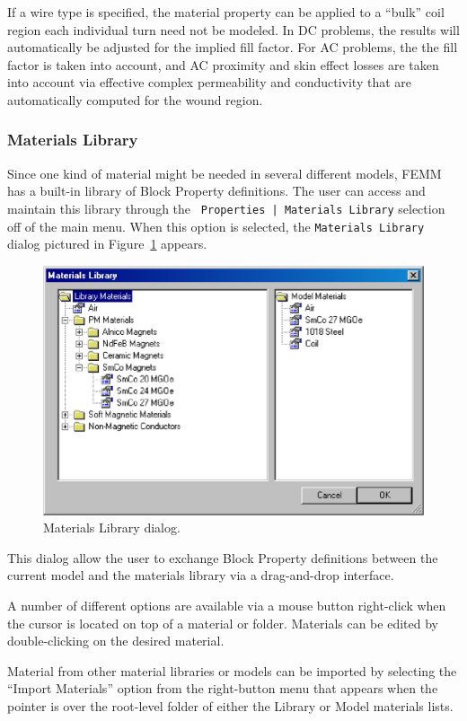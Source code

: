 \documentclass[12pt]{report}
\begin{document}
If a wire type is specified, the material property can be applied to a ``bulk''
coil region each individual turn need not be modeled.  In DC problems, the results
will automatically be adjusted for the implied fill factor.  For AC problems, the
the fill factor is taken into account, and AC proximity and skin effect losses are
taken into account via effective complex permeability and conductivity that are
automatically computed for the wound region.

\subsubsection{Materials Library}

Since one kind of material might be needed in several different
models, FEMM has a built-in library of Block Property definitions.
The user can access and maintain this library through the {\tt
Properties | Materials Library} selection off of the main menu.
When this option is selected, the {\tt Materials Library} dialog
pictured in Figure~\ref{matlibdlg} appears.
\begin{figure}[ht]
\centerline{\includegraphics{fe_matlib.ps}}
\caption{Materials Library dialog.}
\label{matlibdlg}
\end{figure}
This dialog allow the user to exchange Block
Property definitions between the current model and the materials
library via a drag-and-drop interface.

A number of different options are available via a mouse button right-click
when the cursor is located on top of a material or folder. Materials can be edited
by double-clicking on the desired material.

Material from other material libraries or models can be imported by selecting the
``Import Materials'' option from the right-button menu that appears when the pointer
is over the root-level folder of either the Library or Model materials lists.
\end{document}
